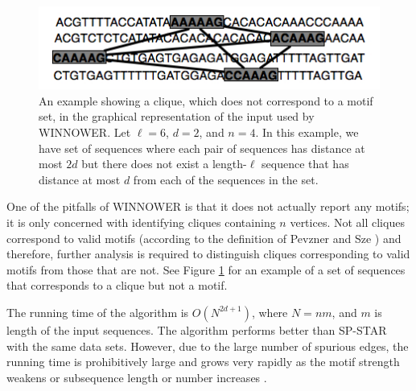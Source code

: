 \begin{figure}[h]
\begin{center}
 \includegraphics[width=\linewidth]{images/winnower}
\caption[An example showing a clique, which does not correspond to a motif set, in the graphical representation of the input used by WINNOWER. ]{An example showing a clique, which does not correspond to a motif set, in the graphical representation of the input used by WINNOWER. Let $\ell = 6$, $d = 2$, and $n = 4$.  In this example, we have set of sequences where each pair of sequences has distance at most $2d$ but there does not exist a length-$\ell$ sequence that has distance at most $d$ from each of the sequences in the set.}
\label{fig:winnower}
\end{center}
\end{figure}


One of the pitfalls of WINNOWER is that it does not actually report any motifs; it is only concerned with identifying cliques containing $n$ vertices.  Not all cliques correspond to valid motifs (according to the definition of Pevzner and Sze \cite{PS00}) and therefore, further analysis is required to distinguish cliques corresponding to valid motifs from those that are not.  See Figure \ref{fig:winnower} for an example of a set of sequences that corresponds to a clique but not a motif. 

The running time of the algorithm is $O(N^{2d + 1})$, where $N=nm$, and $m$ is length of the input sequences. The algorithm performs better than SP-STAR with the same data sets. However, due to the large number of spurious edges, the running time is prohibitively large and grows very rapidly as the motif strength weakens or subsequence length or number increases \cite{LSB04}.   

